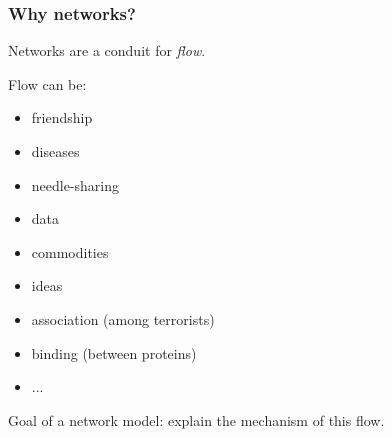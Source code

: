 \documentclass[ 10pt]{beamer}
\begin{document}
\frame
{
\frametitle{Why networks?}
{\large Networks are a conduit for \emph{flow}. } 
\vspace{2mm}

Flow can be:
\begin{itemize}
\item friendship
\item diseases
\item needle-sharing
\item data
\item commodities
\item ideas
\item association (among terrorists)
\item binding (between proteins)
\item ...
\end{itemize}
\vspace{2mm}

{Goal of a network model: explain the mechanism of this flow.} 
}

\end{document}
